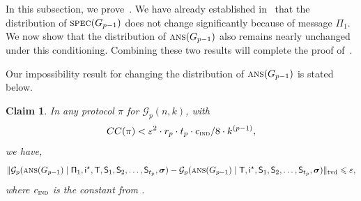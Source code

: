 \documentclass[11pt]{article}
\newtheorem{claim}[lemma]{Claim}
\theoremstyle{definition}
\renewcommand{\leq}{\leqslant}
\newcommand{\tvd}[2]{\ensuremath{\norm{#1 - #2}_{\mathrm{tvd}}}}
\newcommand{\eps}{\ensuremath{\varepsilon}}
\newcommand{\norm}[1]{\ensuremath{\|#1\|}}
\newcommand{\rv}[1]{\ensuremath{{\mathsf{#1}}}\xspace}
\newcommand{\cG}{\ensuremath{\mathcal{G}}}
\newcommand{\ans}{\ensuremath{\textnormal{\textsc{ans}}}}
\newcommand{\spec}{\ensuremath{\textnormal{\textsc{spec}}}}
\newcommand{\prot}{\ensuremath{\pi}}
\newcommand{\Prot}{\ensuremath{\Pi}}
\newcommand{\rProt}{\ensuremath{\rv{\Prot}}}
\newcommand{\rT}{\ensuremath{\rv{T}}}
\newcommand{\rS}{\ensuremath{\rv{S}}}
\newcommand{\rsigma}{\ensuremath{\bm{\sigma}}}
\begin{document}
	In this subsection, we prove~. We have already established in~ that the distribution of $\spec(G_{p-1})$ does not change significantly because of message $\rProt_1$. We now show that the distribution of $\ans(G_{p-1})$ also remains nearly unchanged under this conditioning. Combining these two results will complete the proof of~.



	
	Our impossibility result for changing the distribution of $\ans(G_{p-1})$ is stated below. 
	
	\begin{claim}\label{clm:index-hard}
		In any protocol $\prot$ for $\cG_p(n,k)$, with  $$CC(\prot) < \eps^2 \cdot r_p \cdot t_p \cdot \cind/  8 \cdot k^{(p-1)},$$ we have, 
		\[
		\tvd{	\cG_p(\ans(G_{p-1}) \mid \rProt_1, \ristar, \rT, \rS_1, \rS_2, \ldots, \rS_{t_p}, \rsigma)}{	\cG_p(\ans(G_{p-1}) \mid \rT, \ristar, \rS_1, \rS_2, \ldots, \rS_{t_p}, \rsigma)} \leq \eps,
		\]
		where $c_{\textnormal{\textsc{ind}}}$ is the constant from .
	\end{claim}
	
\end{document}
